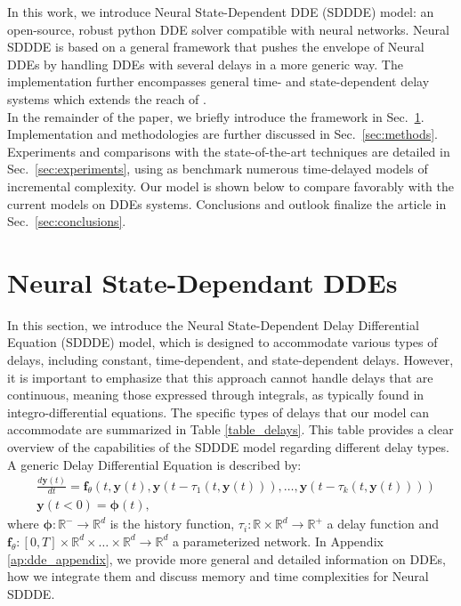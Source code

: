\documentclass[pmlr]{jmlr}%
\begin{document}
In this work, we introduce Neural State-Dependent DDE (SDDDE) model: an open-source, robust python DDE solver compatible with neural networks. Neural SDDDE is based on a general framework that pushes the envelope of Neural DDEs by handling DDEs with several delays in a more generic way. The implementation further encompasses general time- and state-dependent delay systems which extends the reach of \cite{neural_piece_wise_dde}. 
\\

In the remainder of the paper, we briefly introduce the framework in Sec.~\ref{sec:dde}. Implementation and methodologies are further discussed in Sec.~\ref{sec:methods}. Experiments and comparisons with the state-of-the-art techniques are detailed in Sec.~\ref{sec:experiments}, using as benchmark numerous time-delayed models of incremental complexity. Our model is shown below to compare favorably with the current models on DDEs systems. Conclusions and outlook finalize the article in Sec.~\ref{sec:conclusions}.

\section{Neural State-Dependant DDEs}\label{sec:dde}

In this section, we introduce the Neural State-Dependent Delay Differential Equation (SDDDE) model, which is designed to accommodate various types of delays, including constant, time-dependent, and state-dependent delays. However, it is important to emphasize that this approach cannot handle delays that are continuous, meaning those expressed through integrals, as typically found in integro-differential equations. The specific types of delays that our model can accommodate are summarized in Table \ref{table_delays}. This table provides a clear overview of the capabilities of the SDDDE model regarding different delay types. A generic Delay Differential Equation is described by:
%
\begin{equation}
\begin{aligned}
 & \frac{d \mathbf{y}(t)}{dt} = \mathbf{f}_{\theta}(t, \mathbf{y}(t), \mathbf{y}(t-\tau_1(t, \mathbf{y}(t))), \dots, \mathbf{y}(t-\tau_k(t, \mathbf{y}(t)))) \\
&  \mathbf{y}(t<0) = \mathbf{\phi}(t),
\end{aligned}
\label{eqn:dde}
\end{equation}
%
where $\mathbf{\phi}: \mathbb{R}^- \rightarrow \mathbb{R}^d$ is the history function, $\tau_i: \mathbb{R} \times \mathbb{R}^d \rightarrow \mathbb{R}^{+}$  a delay function and $\mathbf{f}_{\theta}:[0, T] \times \mathbb{R}^d \times \dots \times \mathbb{R}^d \rightarrow \mathbb{R}^d$ a parameterized network. In Appendix \ref{ap:dde_appendix}, we provide more general and detailed information on DDEs, how we integrate them and discuss memory and time complexities for Neural SDDDE.

\end{document}
